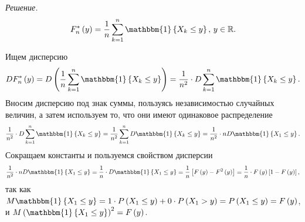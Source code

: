 \textit{Решение.}
$$F_n^* \left( y \right) =
  \frac{1}{n} \sum \limits_{k = 1}^n \mathbbm{1} \left\{ X_k \leq y \right\}, \,
  y \in \mathbb{R}.$$

Ищем дисперсию
$$DF_n^* \left( y \right) =
  D \left( \frac{1}{n} \sum \limits_{k = 1}^n \mathbbm{1} \left\{ X_k \leq y \right\} \right) =
  \frac{1}{n^2} \cdot D \sum \limits_{k = 1}^n \mathbbm{1} \left\{ X_k \leq y \right\}.$$
Вносим дисперсию под знак суммы, пользуясь независимостью случайных величин, а затем используем то,
что они имеют одинаковое распределение
$$ \frac{1}{n^2} \cdot D \sum \limits_{k = 1}^n \mathbbm{1} \left\{ X_k \leq y \right\} =
  \frac{1}{n^2} \sum \limits_{k = 1}^n D \mathbbm{1} \left\{ X_k \leq y \right\} =
  \frac{1}{n^2} \cdot nD \mathbbm{1} \left\{ X_1 \leq y \right\}.$$
Сокращаем константы и пользуемся свойством дисперсии
$$ \frac{1}{n^2} \cdot nD \mathbbm{1} \left\{ X_1 \leq y \right\} =
  \frac{1}{n} \cdot D \mathbbm{1} \left\{ X_1 \leq y \right\} =
  \frac{1}{n} \left[ F \left( y \right) - F^2 \left( y \right) \right] =
  \frac{1}{n} \cdot F \left( y \right) \left[ 1 - F \left( y \right) \right],$$
так как
$M \mathbbm{1} \left\{ X_1 \leq y \right\} =
  1 \cdot P \left( X_1 \leq y \right) + 0 \cdot P \left( X_1 > y \right) =
  P \left( X_1 \leq y \right) =
  F \left( y \right) $,
и $M \left( \mathbbm{1} \left\{ X_1 \leq y \right\} \right)^2 = F \left( y \right) $.
